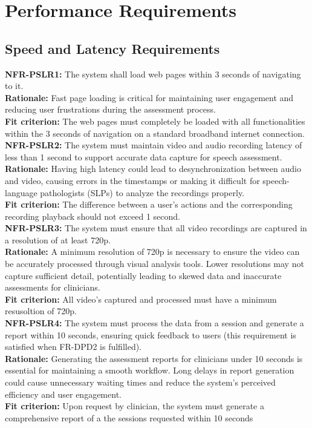 \documentclass[12pt]{article}
\begin{document}
\section{Performance Requirements}
\subsection{Speed and Latency Requirements}
\noindent\textbf{NFR-PSLR1: }The system shall load web pages within 3 seconds of navigating to it.\\
\textbf{Rationale: }Fast page loading is critical for maintaining user engagement and reducing user frustrations during the assessment process.\\
\textbf{Fit criterion: }The web pages must completely be loaded with all functionalities within the 3 seconds of navigation on a standard broadband internet connection.\\

\noindent\textbf{NFR-PSLR2: }The system must maintain video and audio recording latency of less than 1 second to support accurate data capture for speech assessment.\\
\textbf{Rationale: }Having high latency could lead to desynchronization between audio and video, causing errors in the timestamps or making it difficult for speech-language pathologists (SLPs) to analyze the recordings properly.\\
\textbf{Fit criterion: }The difference between a user's actions and the corresponding recording playback should not exceed 1 second. \\

\noindent\textbf{NFR-PSLR3: }The system must ensure that all video recordings are captured in a resolution of at least 720p.\\
\textbf{Rationale: }A minimum resolution of 720p is necessary to ensure the video can be accurately processed through visual analysis tools. Lower resolutions may not capture sufficient detail, potentially leading to skewed data and inaccurate assessments for clinicians.\\
\textbf{Fit criterion: }All video's captured and processed must have a minimum resusoltion of 720p.\\

\noindent\textbf{NFR-PSLR4: }The system must process the data from a session and generate a report within 10 seconds, ensuring quick feedback to users (this requirement is satisfied when FR-DPD2 is fulfilled).\\
\textbf{Rationale: }Generating the assessment reports for clinicians under 10 seconds is essential for maintaining a smooth workflow. Long delays in report generation could cause unnecessary waiting times and reduce the system's perceived efficiency and user engagement.\\
\textbf{Fit criterion: }Upon request by clinician, the system must generate a comprehensive report of a the sessions requested within 10 seconds\\
\end{document}
